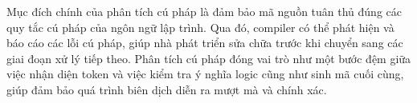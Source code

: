 






\vspace{1cm}

Mục đích chính của phân tích cú pháp là đảm bảo mã nguồn tuân thủ đúng các quy tắc cú pháp của ngôn ngữ lập trình. Qua đó, compiler có thể phát hiện và báo cáo các lỗi cú pháp, giúp nhà phát triển sửa chữa trước khi chuyển sang các giai đoạn xử lý tiếp theo. Phân tích cú pháp đóng vai trò như một bước đệm giữa việc nhận diện token và việc kiểm tra ý nghĩa logic cũng như sinh mã cuối cùng, giúp đảm bảo quá trình biên dịch diễn ra mượt mà và chính xác.
